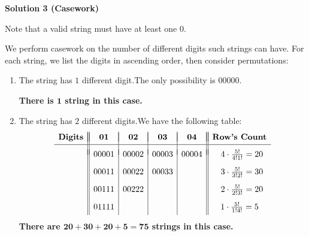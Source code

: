 \begin{enumerate}
 



\textbf{Solution 3 (Casework)}

Note that a valid string must have at least one $0.$

 We perform casework on the number of different digits such strings can have. For each string, we list the digits in ascending order, then consider permutations:

 
            \begin{enumerate} 
        \item The string has $1$ different digit.The only possibility is $00000.$ 

 \textbf{There is $\boldsymbol{1}$ string in this case.} 

 
        \item The string has $2$ different digits.We have the following table:
 \[\begin{array}{c||c|c|c|c||c} & & & & & \\ [-2.5ex] \textbf{Digits} & \boldsymbol{01} & \boldsymbol{02} & \boldsymbol{03} & \boldsymbol{04} & \textbf{Row's Count} \\ [0.5ex] \hline & & & & & \\ [-1.5ex] & 00001 & 00002 & 00003 & 00004 & \hspace{2mm}4\cdot\frac{5!}{4!1!}=20 \\ [2ex]  & 00011 & 00022 & 00033 & & \hspace{2mm}3\cdot\frac{5!}{3!2!}=30 \\ [2ex]  & 00111 & 00222 & & & \hspace{2mm}2\cdot\frac{5!}{2!3!}=20 \\ [2ex]  & 01111 & & & & 1\cdot\frac{5!}{1!4!}=5 \\ [0.75ex] \end{array}\]\textbf{There are $\boldsymbol{20+30+20+5=75}$ strings in this case.} 


\end{enumerate}
\end{enumerate}

